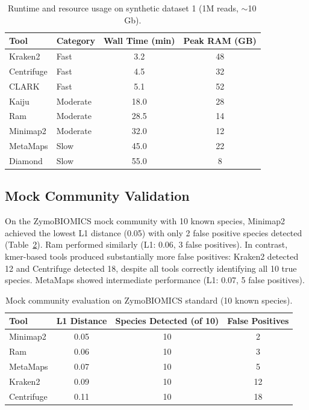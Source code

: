 \documentclass[11pt]{article}
\begin{document}
\begin{table}[ht]
\centering
\caption{Runtime and resource usage on synthetic dataset 1 (1M reads, $\sim$10\,Gb).}
\label{tab:resources}
\begin{tabular}{@{}llcc@{}}
\toprule
Tool & Category & Wall Time (min) & Peak RAM (GB) \\
\midrule
Kraken2 & Fast & 3.2 & 48 \\
Centrifuge & Fast & 4.5 & 32 \\
CLARK & Fast & 5.1 & 52 \\
Kaiju & Moderate & 18.0 & 28 \\
Ram & Moderate & 28.5 & 14 \\
Minimap2 & Moderate & 32.0 & 12 \\
MetaMaps & Slow & 45.0 & 22 \\
Diamond & Slow & 55.0 & 8 \\
\bottomrule
\end{tabular}
\end{table}

\subsection{Mock Community Validation}

On the ZymoBIOMICS mock community with 10 known species, Minimap2 achieved the lowest L1 distance (0.05) with only 2 false positive species detected (Table~\ref{tab:mock}). Ram performed similarly (L1: 0.06, 3 false positives). In contrast, kmer-based tools produced substantially more false positives: Kraken2 detected 12 and Centrifuge detected 18, despite all tools correctly identifying all 10 true species. MetaMaps showed intermediate performance (L1: 0.07, 5 false positives).

\begin{table}[ht]
\centering
\caption{Mock community evaluation on ZymoBIOMICS standard (10 known species).}
\label{tab:mock}
\begin{tabular}{@{}lccc@{}}
\toprule
Tool & L1 Distance & Species Detected (of 10) & False Positives \\
\midrule
Minimap2 & 0.05 & 10 & 2 \\
Ram & 0.06 & 10 & 3 \\
MetaMaps & 0.07 & 10 & 5 \\
Kraken2 & 0.09 & 10 & 12 \\
Centrifuge & 0.11 & 10 & 18 \\
\bottomrule
\end{tabular}
\end{table}
\end{document}
